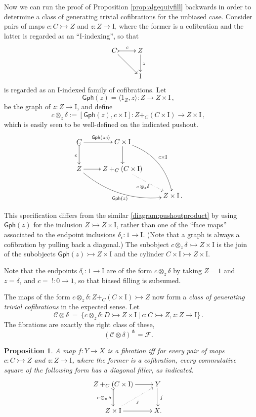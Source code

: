\documentclass[12pt]{article}
\newcommand{\mono}{\ensuremath{\rightarrowtail}}
\newcommand{\ra}{\ensuremath{\rightarrow}}
\newcommand{\too}{\ensuremath{\longrightarrow}}
\newcommand{\I}{\ensuremath{\mathrm{I}}}
\newtheorem{proposition}[theorem]{Proposition}
\theoremstyle{remark}
\theoremstyle{definition}
\begin{document}
Now we can run the proof of Proposition \ref{prop:algequivfill} backwards in order to determine a class of generating trivial cofibrations for the unbiased case. Consider pairs of maps $c : C\mono Z$ and $z:Z\ra\I$, where the former is a cofibration and the latter is regarded as an ``$\I$-indexing'', so that
\[
\xymatrix{
C \ar[rd] \ar@{>->}[r]^{c} & Z  \ar[d]^z \\
& \I
}
\]
is regarded as an $\I$-indexed family of cofibrations.  Let 
\[
\mathsf{Gph}(z) = \langle 1_Z, z\rangle : Z\too Z\times\I\,,
\]
be the graph of $z : Z\ra \I$, and  define
\[
c \otimes_z\!\delta := [\mathsf{Gph}(z), c\times\I] : Z+_C(C\times\I) \ra Z\times \I\,,
\]
which is easily seen to be well-defined on the indicated pushout.
\begin{equation}\label{diagram:unbiasedpushoutproduct}
\xymatrix{
C \ar@{>->}[d]_{c} \ar[r]^{\mathsf{Gph}(zc)} & C\times \I \ar[d] \ar@/^4ex/ [rdd]^{c\times\I}\\
Z \ar@/_4ex/ [rrd]_{\mathsf{Gph}(z)} \ar[r] &  Z +_C (C\times\I) \ar@{.>}[rd]_{c\, \otimes_z \delta} \\
&& Z\times\I\,.
}
\end{equation}

This specification differs from the similar \eqref{diagram:pushoutproduct} by using $\mathsf{Gph}(z)$ for the inclusion $Z\mono Z\times\I$, rather than one of the ``face maps'' associated to the endpoint inclusions $\delta_\epsilon : 1\ra\I$. (Note that a graph is always a cofibration by pulling back a diagonal.)  The subobject $c \otimes_z\!\delta \mono Z\times \I$ is the join of the subobjects $\mathsf{Gph}(z) \mono Z\times \I$ and the cylinder $C\times \I \mono Z\times \I$.

Note that the endpoints $\delta_\epsilon : 1 \ra \I$ are of the form $c \otimes_z\!\delta$ by taking $Z = 1$ and $z = \delta_\epsilon$ and $c =\ ! : 0 \ra 1$, so that biased filling is subsumed. 

The maps of the form $c\otimes_z\delta : Z +_C (C\times\I) \mono Z$  now form a \emph{class of generating trivial cofibrations} in the expected sense.  Let 
\begin{equation}\label{eq:generatingtrivialcofibrations}
\mathcal{C}\otimes\delta\ =\ \{ c \otimes_z \delta : D \mono Z \times \I\ |\ c : C\mono Z, z:Z\ra\I \}\,.
\end{equation}
The fibrations are exactly the right class of these,
\[
(\mathcal{C}\otimes\delta)^{\pitchfork} = \mathcal{F}.
\]
\begin{proposition}\label{prop:fibiffrlp}
A map $f: Y\ra X$ is a fibration iff for every pair of maps $c : C\mono Z$ and $z:Z\ra\I$, where the former is a cofibration, every commutative square of the following form has a diagonal filler, as indicated.
\begin{equation}\label{diagram:unbiasedfibration}
\xymatrix{
Z +_C (C\times\I) \ar@{>->}[d]_{c\, \otimes_z\, \delta} \ar[r] & Y \ar[d]^f \\
Z\times \I \ar@{.>}[ru]_{j} \ar[r] & X.
}
\end{equation}
\end{proposition}
\end{document}

